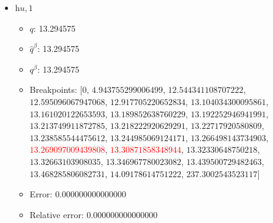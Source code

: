 \documentclass{article}%
\begin{document}
\begin{itemize}
\begin{itemize}
		\item Error: 0.000000000000000%
		\item Relative error: 0.000000000000000%
	\end{itemize}%
	\item $\textit{hu},1$%
	\begin{itemize}%
		\item $q$: 13.294575%
		\item $\hat{q}^\beta$: 13.294575%
		\item $q^\beta$: 13.294575%
		\item Breakpoints: $[$$0$, $4.943755299006499$, $12.544341108707222$, $12.595096067947068$, $12.917705220652834$, $13.104034300095861$, $13.161020122653593$, $13.189852638760229$, $13.192252946941991$, $13.213749911872785$, $13.218222920629291$, $13.22717920580809$, $13.238585544475612$, $13.244985069124171$, $13.266498143734903$, \textcolor{red}{$13.269097009439808$}, \textcolor{red}{$13.30871858348944$}, $13.32330648750218$, $13.32663103908035$, $13.346967780023082$, $13.439500729482463$, $13.468285806082731$, $14.09178614751222$, $237.3002543523117$$]$%
		\item Error: 0.000000000000000%
		\item Relative error: 0.000000000000000%
	\end{itemize}%
\end{itemize}%
\end{document}
